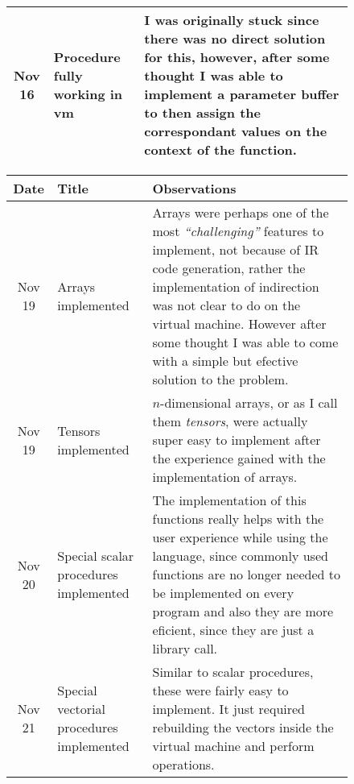 \begin{figure}[h]
\begin{tabular}{cp{1.25in}p{2.5in}}
        \midrule
        Nov 16 & Procedure fully working in vm &
        I was originally stuck since there was no direct solution for this,
        however, after some thought I was able to implement a parameter buffer
        to then assign the correspondant values on the context of the function.\\

        \bottomrule
    \end{tabular}
\end{figure}

\begin{figure}[h]
    \centering
    \begin{tabular}{cp{1.25in}p{2.5in}}
        \toprule
        \textbf{Date} & \textbf{Title} & \textbf{Observations}\\
        \midrule
        Nov 19 & Arrays implemented &
        Arrays were perhaps one of the most \emph{``challenging''} features to
        implement, not because of IR code generation, rather the implementation
        of indirection was not clear to do on the virtual machine. However
        after some thought I was able to come with a simple but efective
        solution to the problem.\\ 

        \midrule
        Nov 19 & Tensors \newline implemented &
        $n$-dimensional arrays, or as I call them \emph{tensors}, were actually
        super easy to implement after the experience gained with the
        implementation of arrays.\\

        \midrule
        Nov 20 & Special scalar \newline procedures \newline implemented &
        The implementation of this functions really helps with the user
        experience while using the language, since commonly used functions are
        no longer needed to be implemented on every program and also they are
        more eficient, since they are just a \newline library call.\\

        \midrule
        Nov 21 & Special vectorial \newline procedures \newline implemented &
        Similar to scalar procedures, these were fairly easy to implement. It
        just required rebuilding the vectors inside the virtual machine and
        perform operations.\\


\end{tabular}
\end{figure}

